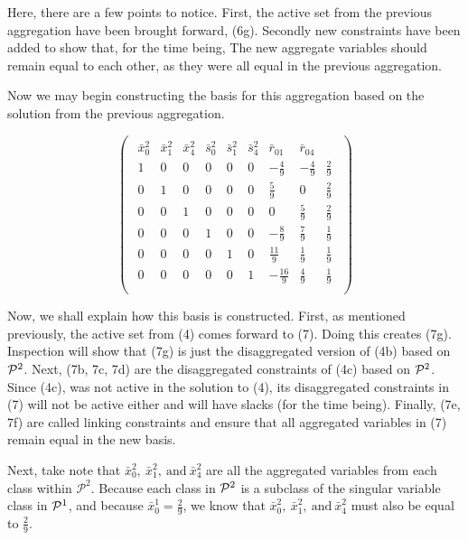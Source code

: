 \documentclass[11pt]{article} %
\newcommand{\cP}{{\cal P}}
\begin{document}
	Here, there are a few points to notice.  First, the active set from the previous aggregation have been brought forward, (6g).  Secondly new constraints have been added to show that, for the time being, The new aggregate variables should remain equal to each other, as they were all equal in the previous aggregation. 
	
	Now we may begin constructing the basis for this aggregation based on the solution from the previous aggregation.
	
	\begin{equation}
	\begin{pmatrix}
	\begin{array}{cccccccc|c}
	\bar{x}^2_0 & \bar{x}^2_1 & \bar{x}^2_4 & \bar{s}^2_0 & \bar{s}^2_1 & \bar{s}^2_4 & \bar{r}_{01} & \bar{r}_{04} \\
	\hline
	1 & 0 & 0 & 0 & 0 & 0 & -\frac{4}{9} & -\frac{4}{9} & \frac{2}{9} \\ 
	0 & 1 & 0 & 0 & 0 & 0 & \frac{5}{9} & 0 & \frac{2}{9} \\ 
	0 & 0 & 1 & 0 & 0 & 0 & 0 & \frac{5}{9} & \frac{2}{9} \\ 
	0 & 0 & 0 & 1 & 0 & 0 & -\frac{8}{9} & \frac{7}{9} & \frac{1}{9} \\ 
	0 & 0 & 0 & 0 & 1 & 0 & \frac{11}{9} & \frac{1}{9} & \frac{1}{9} \\
	0 & 0 & 0 & 0 & 0 & 1 & -\frac{16}{9} & \frac{4}{9} & \frac{1}{9} \\
	\end{array}
	\end{pmatrix}
	\end{equation}
	
	Now, we shall explain how this basis is constructed.  First, as mentioned previously, the active set from (4) comes forward to (7).  Doing this creates (7g).  Inspection will show that (7g) is just the disaggregated version of (4b) based on $\cP^2$. Next, (7b, 7c, 7d) are the disaggregated constraints of (4c) based on $\cP^2$.  Since (4c), was not active in the solution to (4), its disaggregated constraints in (7) will not be active either and will have slacks (for the time being).  Finally, (7e, 7f) are called linking constraints and ensure that all aggregated variables in (7) remain equal in the new basis.
	
	Next, take note that $\bar{x}_0^2, \ \bar{x}_1^2, \ \text{and} \ \bar{x}_4^2$ are all the aggregated variables from each class within $\mathcal{P}^2$.  Because each class in $\cP^2$ is a subclass of the singular variable class in $\cP^1$, and because $\bar{x}_0^1 = \frac{2}{9}$, we know that $\bar{x}_0^2, \ \bar{x}_1^2, \ \text{and} \ \bar{x}_4^2$ must also be equal to $\frac{2}{9}$.  
	
\end{document}
